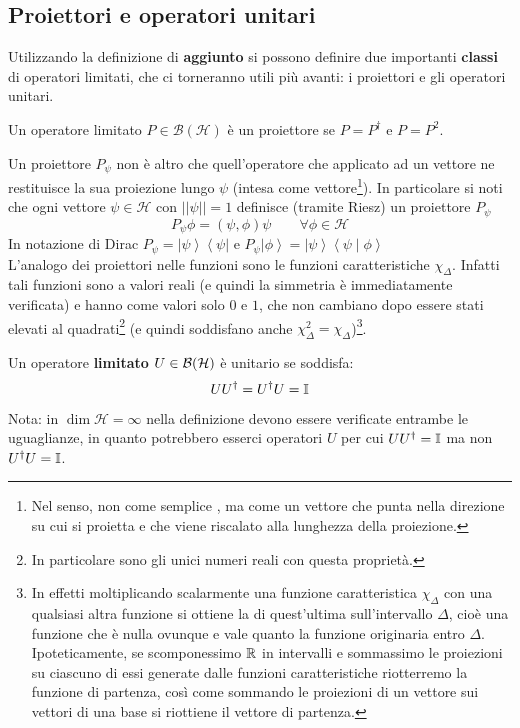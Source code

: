 \documentclass[../../FisicaTeorica.tex]{subfiles}
\begin{document}
\subsection{Proiettori e operatori unitari}
Utilizzando la definizione di \textbf{aggiunto} si possono definire due importanti \textbf{classi} di operatori limitati, che ci torneranno utili più avanti: i proiettori e gli operatori unitari.
\begin{dfn}[Proiettore]
 Un operatore limitato $P\in\mathcal{B}(\mathcal{H})$ è un proiettore se $P=P^\dag$ e $P=P^2$.
\end{dfn}
Un proiettore $P_\psi$ non è altro che quell'operatore che applicato ad un vettore ne restituisce la sua proiezione lungo $\psi$ (intesa come vettore\footnote{Nel senso, non come semplice , ma come un vettore che punta nella direzione su cui si proietta e che viene riscalato alla lunghezza della proiezione.}).
In particolare si noti che ogni vettore $\psi\in\mathcal{H}$ con $\left|\left|\psi\right|\right|=1$ definisce (tramite Riesz) un proiettore $P_\psi$
\begin{equation}
P_\psi\phi=\left(\psi,\phi\right)\psi\qquad \forall\phi\in\mathcal{H}
\label{eqn:proiettore}
\end{equation}
In notazione di Dirac $P_\psi=\left|\psi\right\rangle\left\langle\psi\right|$ e $P_\psi\left|\phi\right\rangle=\left|\psi\right\rangle\left\langle\psi\middle|\phi\right\rangle$\\
L'analogo dei proiettori nelle funzioni sono le funzioni caratteristiche $\chi_\Delta$. Infatti tali funzioni sono a valori reali (e quindi la simmetria è immediatamente verificata) e hanno come valori solo $0$ e $1$, che non cambiano dopo essere stati elevati al quadrati\footnote{In particolare sono gli unici numeri reali con questa proprietà.} (e quindi soddisfano anche $\chi_\Delta^2 = \chi_\Delta$)\footnote{In effetti moltiplicando scalarmente una funzione caratteristica $\chi_\Delta$ con una qualsiasi altra funzione si ottiene la  di quest'ultima sull'intervallo $\Delta$, cioè una funzione che è nulla ovunque e vale quanto la funzione originaria entro $\Delta$. Ipoteticamente, se scomponessimo $\mathbb{R}$ in intervalli e sommassimo le proiezioni su ciascuno di essi generate dalle funzioni caratteristiche riotterremo la funzione di partenza, così come sommando le proiezioni di un vettore sui vettori di una base si riottiene il vettore di partenza.}.

\begin{dfn}  Un operatore \textbf{limitato} $U\in \mathcal{B}(\mathcal{H})$ è unitario se soddisfa:
\begin{equation}
UU^\dag=U^\dag U=\mathbb{I}
\label{eqn:unitario}
\end{equation}
\end{dfn}
Nota: in $\dim{\mathcal{H}=\infty}$ nella definizione devono essere verificate entrambe le uguaglianze, in quanto potrebbero esserci operatori $U$ per cui $U U^\dag = \mathbb{I}$ ma non $U^\dag U = \mathbb{I}$. \\
\end{document}
